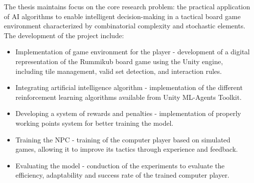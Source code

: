The thesis maintains focus on the core research problem: the practical application of AI algorithms to enable intelligent decision-making in a tactical board game environment characterized by combinatorial complexity and stochastic elements. The development of the project include:
\begin{itemize}
	\item Implementation of game environment for the player - development of a digital representation of the Rummikub board game using the Unity engine, including tile management, valid set detection, and interaction rules.
	\item Integrating artificial intelligence algorithm - implementation of the different reinforcement learning algorithms available from Unity ML-Agents Toolkit.
	\item Developing a system of rewards and penalties - implementation of properly working points system for better training the model.
	\item Training the NPC - training of the computer player based on simulated games, allowing it to improve its tactics through experience and feedback.
	\item Evaluating the model - conduction of the experiments to evaluate the efficiency, adaptability and success rate of the trained computer player.
\end{itemize}
